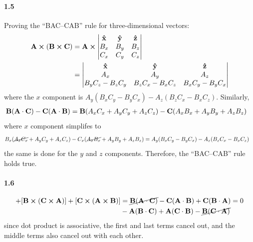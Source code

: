 \documentclass[../main.tex]{subfiles}
\begin{document}
\paragraph{1.5}
Proving the ``BAC--CAB'' rule for three-dimensional vectors:
\begin{align*}
    \vb{A} \cp (\vb{B} \cp \vb{C}) &= \vb{A} \cp
    \begin{vmatrix}
        \vu{x} & \vu{y} & \vu{z} \\
        B_x & B_y & B_z \\
        C_x & C_y & C_z
    \end{vmatrix} \\
    &= \begin{vmatrix}
        \vu{x} & \vu{y} & \vu{z} \\
        A_x & A_y & A_z \\
        B_y C_z - B_z C_y & B_z C_x - B_x C_z & B_x C_y - B_y C_x
    \end{vmatrix}
\end{align*}
where the $x$ component is $A_y (B_x C_y - B_y C_x) - A_z (B_z C_x - B_x C_z)$. Similarly,
\begin{align*}
    \vb{B}(\vb{A} \cdot \vb{C}) - \vb{C}(\vb{A} \cdot \vb{B}) &=
        \vb{B} (A_x C_x + A_y C_y + A_z C_z) - \vb{C} (A_x B_x + A_y B_y + A_z B_z)
\end{align*}
where $x$ component simplifes to
\begin{align*}
    B_x (\cancel{A_x C_x} + A_y C_y + A_z C_z) - C_x (\cancel{A_x B_x}+ A_y B_y + A_z B_z) &=
        A_y (B_x C_y - B_y C_x) - A_z (B_z C_x - B_x C_z)
\end{align*}
the same is done for the $y$ and $z$ components. Therefore, the ``BAC--CAB'' rule holds true.

\paragraph{1.6}
\begin{align*}
    [\vb{A} \cp (\vb{B} \cp \vb{C})] + [\vb{B} \cp (\vb{C} \cp \vb{A})] 
        + [\vb{C} \cp (\vb{A} \cp \vb{B})]
    &= \cancel{\vb{B}(\vb{A} \cdot \vb{C})} - \vb{C}(\vb{A} \cdot \vb{B})
    + \vb{C}(\vb{B} \cdot \vb{A}) = 0 \\ &- \vb{A}(\vb{B} \cdot \vb{C})
    + \vb{A}(\vb{C} \cdot \vb{B}) - \cancel{\vb{B}(\vb{C} \cdot \vb{A})}\\
\end{align*}
since dot product is associative, the first and last terms cancel out, and the middle terms also
cancel out with each other.
\end{document}
